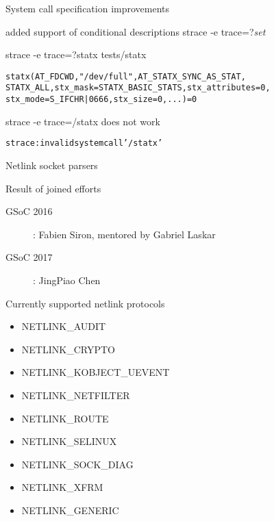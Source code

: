 \documentclass[unicode]{beamer}
\begin{document}
\begin{frame}[fragile]{System call specification improvements}
\begin{block}{\large added support of conditional descriptions}
strace -e trace=?\textit{set}
\end{block}
\begin{block}{\large strace -e trace=?statx tests/statx}
\begin{alltt}
statx(AT_FDCWD, "/dev/full", AT_STATX_SYNC_AS_STAT,
STATX_ALL, {stx_mask=STATX_BASIC_STATS, stx_attributes=0,
stx_mode=S_IFCHR|0666, stx_size=0, ...}) = 0
\end{alltt}
\end{block}
\begin{block}{\large strace -e trace=/statx does not work}
\begin{alltt}
strace: invalid system call '/statx'
\end{alltt}
\end{block}
\end{frame}

\begin{frame}{Netlink socket parsers}
\begin{block}{Result of joined efforts}
\begin{description}
\item[GSoC 2016]: Fabien Siron, mentored by Gabriel Laskar
\item[GSoC 2017]: JingPiao Chen
\end{description}
\end{block}
\begin{block}{Currently supported netlink protocols}
\begin{itemize}
\item NETLINK\_AUDIT
\item NETLINK\_CRYPTO
\item NETLINK\_KOBJECT\_UEVENT
\item NETLINK\_NETFILTER
\item NETLINK\_ROUTE
\item NETLINK\_SELINUX
\item NETLINK\_SOCK\_DIAG
\item NETLINK\_XFRM
\item NETLINK\_GENERIC
\end{itemize}
\end{block}
\end{frame}
\end{document}
